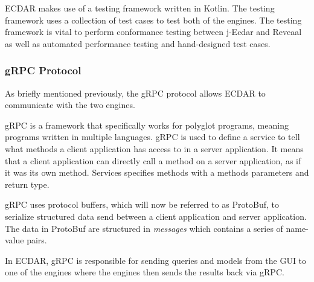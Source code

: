 ECDAR makes use of a testing framework written in Kotlin. 
The testing framework uses a collection of test cases to test both of the engines. 
The testing framework is vital to perform conformance testing between j-Ecdar and Reveaal as well as automated performance testing and hand-designed test cases. 


\subsubsection{gRPC Protocol} \label{subsub:grpc-protocol}
As briefly mentioned previously, the gRPC protocol allows ECDAR to communicate with the two engines.

gRPC is a framework that specifically works for polyglot programs, meaning programs written in multiple languages.
gRPC is used to define a service to tell what methods a client application has access to in a server application.
It means that a client application can directly call a method on a server application, as if it was its own method.
Services specifies methods with a methods parameters and return type.

gRPC uses protocol buffers, which will now be referred to as ProtoBuf, to serialize structured data send between a client application and server application.
The data in ProtoBuf are structured in \textit{messages} which contains a series of name-value pairs.

In ECDAR, gRPC is responsible for sending queries and models from the GUI to one of the engines where the engines then sends the results back via gRPC.
